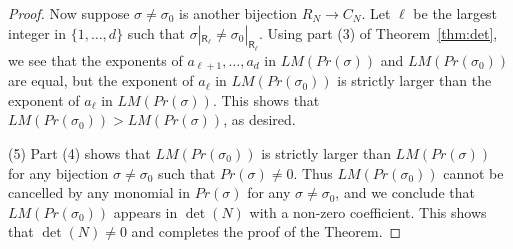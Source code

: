 \documentclass[10pt,a4paper]{amsart}
\newcommand{\Rs}{\mathsf{R}}
\begin{document}
\begin{proof}
  Now suppose $\sigma\neq\sigma_0$ is another bijection $R_N\to C_N$.
  Let $\ell$ be the largest integer in $\{1,\dots,d\}$ such that
  $\sigma |_{\Rs_\ell}\neq\sigma_{0}|_{\Rs_\ell}$. Using part (3) of
  Theorem~\ref{thm:det}, we see that the exponents of
  $a_{\ell+1},\dots,a_d$ in $LM(Pr(\sigma))$ and $LM(Pr(\sigma_0))$
  are equal, but the exponent of $a_\ell$ in $LM(Pr(\sigma_0))$ is
  strictly larger than the exponent of $a_\ell$ in $LM(Pr(\sigma))$.
  This shows that $LM(Pr(\sigma_0))>LM(Pr(\sigma))$, as desired.

  (5) Part (4) shows that $LM(Pr(\sigma_0))$ is strictly larger than
  $LM(Pr(\sigma))$ for any bijection $\sigma\neq\sigma_0$ such that
  $Pr(\sigma)\neq0$.  Thus $LM(Pr(\sigma_0))$ cannot be cancelled by
  any monomial in $Pr(\sigma)$ for any $\sigma\neq\sigma_0$, and we
  conclude that $LM(Pr(\sigma_0))$ appears in $\det(N)$ with a
  non-zero coefficient.  This shows that $\det(N)\neq0$ and completes
  the proof of the Theorem.
\end{proof}
\end{document}

